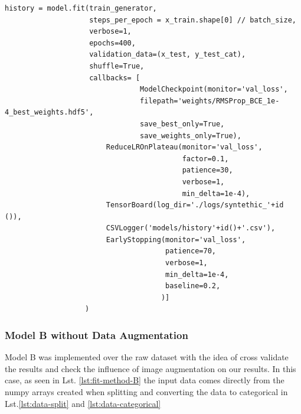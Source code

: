 \documentclass[12pt,a4paper]{scrartcl}
\begin{document}
\begin{lstlisting}[caption={Model A training parameters, this is a code snippet from the  \emph{train\_model\_A} method in \emph{train.py}}, label={lst:fit-method:A}]
history = model.fit(train_generator,
                    steps_per_epoch = x_train.shape[0] // batch_size,
                    verbose=1, 
                    epochs=400, 
                    validation_data=(x_test, y_test_cat),
                    shuffle=True,
                    callbacks= [
                                ModelCheckpoint(monitor='val_loss',
                                filepath='weights/RMSProp_BCE_1e-4_best_weights.hdf5',
                                save_best_only=True,
                                save_weights_only=True),
                        ReduceLROnPlateau(monitor='val_loss',
                                          factor=0.1,
                                          patience=30,
                                          verbose=1,
                                          min_delta=1e-4),
                        TensorBoard(log_dir='./logs/syntethic_'+id ()),
                        CSVLogger('models/history'+id()+'.csv'),
                        EarlyStopping(monitor='val_loss',
                                      patience=70,
                                      verbose=1,
                                      min_delta=1e-4,
                                      baseline=0.2,
                                     )]
                   )
\end{lstlisting}

\subsubsection{Model B without Data Augmentation}

Model B was implemented over the raw dataset with the idea of cross validate the results and check the influence of image augmentation on our results. In this case, as seen in Lst. \ref{lst:fit-method-B} the input data comes directly from the numpy arrays created when splitting and converting the data to categorical in Lst.\ref{lst:data-split} and \ref{lst:data-categorical} 
\end{document}
